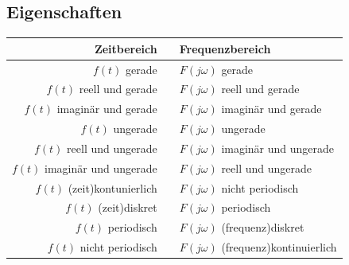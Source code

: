				
		\subsection{Eigenschaften}
				
					\renewcommand{\arraystretch}{1}					
					\begin{tabular}{rcl}
						\hline 
							\textbf{Zeitbereich} & \laplace  & \textbf{Frequenzbereich} \\ 
						\hline 
						\hline
							$f(t)$ gerade & \laplace & $F(j \omega)$ gerade  \\ 
						\hline 
							$f(t)$ reell und gerade & \laplace & $F(j \omega)$ reell und gerade\\ 
						\hline 
							$f(t)$ imaginär und gerade & \laplace & $F(j \omega)$ imaginär und gerade \\ 
						\hline 
							$f(t)$ ungerade & \laplace & $F(j \omega)$ ungerade \\ 
						\hline 
							$f(t)$ reell und ungerade & \laplace & $F(j \omega)$ imaginär und ungerade \\ 
						\hline 
							$f(t)$ imaginär und ungerade & \laplace & $F(j \omega)$ reell und ungerade\\ 
						\hline 
							$f(t)$ (zeit)kontunierlich & \laplace & $F(j \omega)$ nicht periodisch \\ 
						\hline 
							$f(t)$ (zeit)diskret & \laplace & $F(j \omega)$ periodisch \\ 
						\hline 
							$f(t)$ periodisch & \laplace & $F(j \omega)$ (frequenz)diskret\\ 
						\hline 
							$f(t)$ nicht periodisch & \laplace & $F(j \omega)$ (frequenz)kontinuierlich\\ 
						\hline 
					\end{tabular}
					\renewcommand{\arraystretch}{\arraystretchOriginal}	
					
